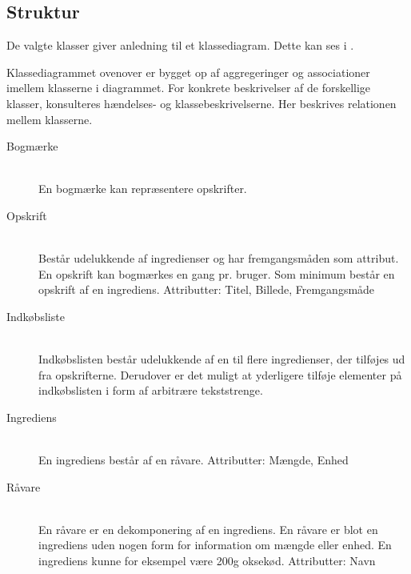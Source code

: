 \subsection{Struktur}

De valgte klasser giver anledning til et klassediagram. Dette kan ses i . 



Klassediagrammet ovenover er bygget op af aggregeringer og associationer imellem klasserne i diagrammet. For konkrete beskrivelser af de forskellige klasser, konsulteres hændelses- og klassebeskrivelserne. Her beskrives relationen mellem klasserne.

\begin{description}
  \item[Bogmærke] \hfill \\
    En bogmærke kan repræsentere opskrifter.

  \item[Opskrift] \hfill \\
    Består udelukkende af ingredienser og har fremgangsmåden som attribut. En opskrift kan bogmærkes en gang pr. bruger. Som minimum består en opskrift af en ingrediens.
Attributter: Titel, Billede, Fremgangsmåde

\item[Indkøbsliste] \hfill \\
  Indkøbslisten består udelukkende af en til flere ingredienser, der tilføjes ud fra opskrifterne. Derudover er det muligt at yderligere tilføje elementer på indkøbslisten i form af arbitrære tekststrenge.

\item[Ingrediens] \hfill \\
  En ingrediens består af en råvare.
Attributter: Mængde, Enhed

\item[Råvare] \hfill \\
  En råvare er en dekomponering af en ingrediens. En råvare er blot en ingrediens uden nogen form for information om mængde eller enhed. En ingrediens kunne for eksempel være 200g oksekød.
Attributter: Navn
\end{description}

